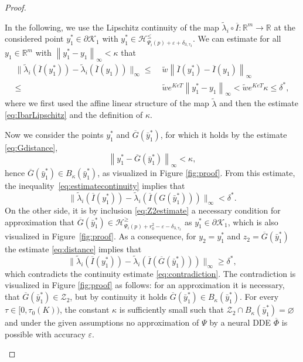 \documentclass[10pt]{article}
\numberwithin{equation}{section}
\newcommand{\eps}{\varepsilon}
\newcommand\norm[1]{\left\lVert#1\right\rVert}
\newcommand\normm[1]{\big\lVert#1\big\lVert}
\begin{document}
\begin{proof}
\begin{enumerate}
			
			In the following, we use the Lipschitz continuity of the map $\tilde \lambda_i\circ\overline{I}:\mathbb{R}^m\rightarrow \mathbb{R}$ at the considered point $y_1^\ast\in\partial\mathcal{K}_1$ with $y_1^\ast \in \mathcal{H}^{\leq}_{\Psi_i(p)+\eps+\delta_{3,\tau_3}}$. We can estimate for all  $y_1\in\mathbb{R}^m$ with $\norm{y_1^\ast-y_1}_\infty < \kappa$ that 
			\begin{align}
				\normm{\tilde{\lambda}_i(\overline{I}(y_1^\ast))-\tilde{\lambda}_i(\overline{I}(y_1))}_\infty \leq \; &\tilde w  \norm{\overline{I}(y_1^\ast)-\overline{I}(y_1)}_\infty \nonumber \\
				\leq \; &\tilde w  e^{KeT} \norm{y_1^\ast-y_1}_\infty < \tilde w e^{KeT} \kappa \leq \delta^\ast, \label{eq:estimatecontinuity}
			\end{align}
			where we first used the affine linear structure of the map $\tilde \lambda$ and then the estimate \eqref{eq:IbarLipschitz} and the definition of $\kappa$.
			
			Now we consider the points $y_1^\ast$ and $\overline G(\bar y_1^\ast)$, for which it holds by the estimate \eqref{eq:Gdistance},
			\begin{equation*}
				\norm{y_1^\ast-\overline G(\bar y_1^\ast)}_\infty  < \kappa,
			\end{equation*}
			hence $\overline G(\bar y_1^\ast) \in B_\kappa(\bar y_1^\ast)$, as visualized in Figure \ref{fig:proof}. From this estimate, the inequality~\eqref{eq:estimatecontinuity}  implies that
			\begin{equation}\label{eq:contradiction}
				\normm{\tilde{\lambda}_i(\overline{I}(y_1^\ast))-\tilde{\lambda}_i(\overline{I}(G(\bar y_1^\ast)))}_\infty < \delta^\ast.
			\end{equation}
			On the other side,  it is by inclusion \eqref{eq:Z2estimate} a necessary condition for approximation that $\overline G(\bar y_1^\ast)\in \mathcal{H}^{\geq}_{\Psi_i(p)+r_0^2-\eps-\delta_{3,\tau_3}}$ as $y_1^\ast\in\partial\mathcal{K}_1$, which is also visualized  in Figure~\ref{fig:proof}. As a consequence, for $y_2 = y_1^\ast$ and $z_2 =\overline  G(\bar y_1^\ast)$ the estimate \eqref{eq:distance} implies that 
			\begin{equation*}
				\normm{\tilde{\lambda}_i(\overline{I}(y_1^\ast))-\tilde{\lambda}_i(\overline{I}(\overline G(\bar y_1^\ast)))}_\infty \geq \delta^\ast,
			\end{equation*}
			which contradicts the continuity estimate \eqref{eq:contradiction}. The contradiction is visualized in Figure \ref{fig:proof} as follows: for an approximation it is necessary, that $\overline  G(\bar y_1^\ast)\in\mathcal{Z}_2$, but by continuity it holds  $\overline G(\bar y_1^\ast) \in B_\kappa(\bar y_1^\ast)$. For every $\tau\in[0,\tau_0(K))$, the constant $\kappa$ is sufficiently small such that $\mathcal{Z}_2\cap B_\kappa(\bar y_1^\ast) = \varnothing$ and under the given assumptions no approximation of $\Psi$ by a neural DDE $\overline{\Phi}$ is possible with accuracy $\eps$.
			

\end{enumerate}
\end{proof}
\end{document}
